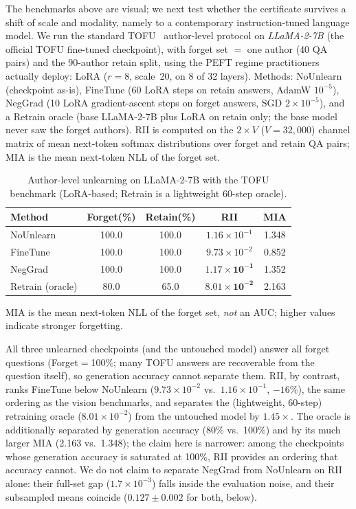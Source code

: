 \documentclass[smallextended]{svjour3}       %
\begin{document}
The benchmarks above are visual; we next test whether the certificate survives a shift of scale and modality, namely to a contemporary instruction-tuned language model. We run the standard TOFU~\cite{maini2024tofu} author-level protocol on \emph{LLaMA-2-7B} (the official TOFU fine-tuned checkpoint), with forget set $=$ one author (40 QA pairs) and the 90-author retain split, using the PEFT regime practitioners actually deploy: LoRA ($r{=}8$, scale~20, on 8 of 32 layers). Methods: NoUnlearn (checkpoint as-is), FineTune (60 LoRA steps on retain answers, AdamW $10^{-5}$), NegGrad (10 LoRA gradient-ascent steps on forget answers, SGD $2{\times}10^{-5}$), and a Retrain oracle (base LLaMA-2-7B plus LoRA on retain only; the base model never saw the forget authors). RII is computed on the $2\times V$ ($V{=}32{,}000$) channel matrix of mean next-token softmax distributions over forget and retain QA pairs; MIA is the mean next-token NLL of the forget set.

\begin{table}[t]
\centering
\small
\caption{Author-level unlearning on LLaMA-2-7B with the TOFU benchmark (LoRA-based; Retrain is a lightweight 60-step oracle).}\label{tab:llm}
\setlength{\tabcolsep}{2pt}
\begin{tabular}{l c c c c}
\toprule
Method & Forget(\%) & Retain(\%) & RII & MIA \\
\midrule
NoUnlearn & 100.0 & 100.0 & $1.16{\times}10^{-1}$ & 1.348 \\
FineTune & 100.0 & 100.0 & $9.73{\times}10^{-2}$ & 0.852 \\
NegGrad & 100.0 & 100.0 & $\mathbf{1.17{\times}10^{-1}}$ & 1.352 \\
Retrain (oracle) & 80.0 & 65.0 & $\mathbf{8.01{\times}10^{-2}}$ & 2.163 \\
\bottomrule
\end{tabular}
\par\vspace{2pt}\footnotesize MIA is the mean next-token NLL of the forget set, \emph{not} an AUC; higher values indicate stronger forgetting.
\end{table}

All three unlearned checkpoints (and the untouched model) answer all forget questions (Forget$=$100\%; many TOFU answers are recoverable from the question itself), so generation accuracy cannot separate them. RII, by contrast, ranks FineTune below NoUnlearn ($9.73{\times}10^{-2}$ vs.\ $1.16{\times}10^{-1}$, $-16\%$), the same ordering as the vision benchmarks, and separates the (lightweight, 60-step) retraining oracle ($8.01{\times}10^{-2}$) from the untouched model by $1.45\times$. The oracle is additionally separated by generation accuracy (80\% vs.\ 100\%) and by its much larger MIA (2.163 vs.\ 1.348); the claim here is narrower: among the checkpoints whose generation accuracy is saturated at 100\%, RII provides an ordering that accuracy cannot. We do not claim to separate NegGrad from NoUnlearn on RII alone: their full-set gap ($1.7{\times}10^{-3}$) falls inside the evaluation noise, and their subsampled means coincide ($0.127\pm0.002$ for both, below).
\end{document}
